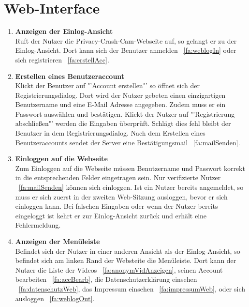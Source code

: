 \section{\gls{Web-Interface}}
\begin{enumerate}
\renewcommand{\labelenumi}{\textbf{\theenumi}}
\renewcommand{\theenumi}{FA\arabic{enumi}0}
\setcounter{enumi}{299}
\item \label{fa:loginWeb} \textbf{Anzeigen der Einlog-Ansicht} \hfill \\
Ruft der Nutzer die Privacy-Crash-Cam-Webseite auf, so gelangt er zu der Einlog-Ansicht. Dort kann sich der Benutzer anmelden ~\eqref{fa:weblogIn} oder sich registrieren ~\eqref{fa:erstellAcc}.

\item \label{fa:erstellAcc}\textbf{Erstellen eines Benutzeraccount} \hfill \\
Klickt der Benutzer auf "'Account erstellen"' so öffnet sich der Registrierungsdialog. Dort wird der Nutzer gebeten einen einzigartigen Benutzername und eine \gls{E-Mail} Adresse angegeben. Zudem muss er ein Passwort auswählen und bestätigen. Klickt der Nutzer auf "'Registrierung abschließen"' werden die Eingaben überprüft. Schlägt dies fehl bleibt der Benutzer in dem Registrierungsdialog. Nach dem Erstellen eines Benutzeraccounts sendet der Server eine Bestätigungsmail ~\eqref{fa:mailSenden}.

\item \label{fa:weblogIn}\textbf{Einloggen auf die Webseite} \hfill \\
Zum Einloggen auf die Webseite müssen Benutzername und Passwort korrekt in die entsprechenden Felder eingetragen sein. Nur verifizierte Nutzer ~\eqref{fa:mailSenden} können sich einloggen. Ist ein Nutzer bereits angemeldet, so muss er sich zuerst in der zweiten Web-Sitzung ausloggen, bevor er sich einloggen kann. Bei falschen Eingaben oder wenn der Nutzer bereits eingeloggt ist kehrt er zur Einlog-Ansicht zurück und erhält eine Fehlermeldung.

\item \textbf{Anzeigen der Menüleiste} \hfill \\
Befindet sich der Nutzer in einer anderen Ansicht als der Einlog-Ansicht, so befindet sich am linken Rand der Websteite die Menüleiste. Dort kann der Nutzer die Liste der  Videos ~\eqref{fa:anonymVidAnzeigen}, seinen Account bearbeiten ~\eqref{fa:accBearb}, die Datenschutzerklärung einsehen ~\eqref{fa:datenschutzWeb}, das Impressum einsehen ~\eqref{fa:impressumWeb}, oder sich ausloggen ~\eqref{fa:weblogOut}.


\end{enumerate}
